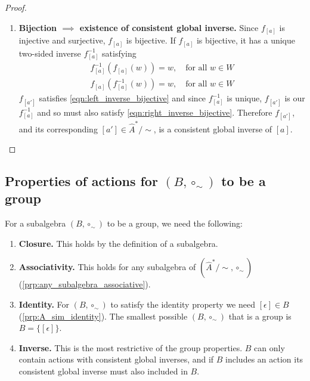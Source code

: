 \begin{proof}
\begin{enumerate}[(1)]
    \item \textbf{Bijection $\implies$ existence of consistent global inverse.}
    Since $f_{[a]}$ is injective and surjective, $f_{[a]}$ is bijective.
    If $f_{[a]}$ is bijective, it has a unique two-sided inverse $f_{[a]}^{-1}$ satisfying
    \begin{align}
        f_{[a]}^{-1}(f_{[a]}(w)) = w, \quad \text{for all $w \in W$} 
        \label{eqn:left_inverse_bijective}
        \\
        f_{[a]}(f_{[a]}^{-1}(w)) = w, \quad \text{for all $w \in W$}
        \label{eqn:right_inverse_bijective}
    \end{align}
    $f_{[a']}$ satisfies \cref{eqn:left_inverse_bijective} and since $f_{[a]}^{-1}$ is unique, $f_{[a']}$ is our $f_{[a]}^{-1}$ and so must also satisfy \cref{eqn:right_inverse_bijective}.
    Therefore $f_{[a']}$, and its corresponding $[a'] \in \hat{A}^{*}/\sim$, is a consistent global inverse of $[a]$.
    \end{enumerate}
\end{proof}

\subsection{Properties of actions for $(B, \circ_{\sim})$ to be a group}

For a subalgebra $(B, \circ_{\sim})$ to be a group, we need the following:
\begin{enumerate}[(1)]
    \item \textbf{Closure.}
    This holds by the definition of a subalgebra.
    
    \item \textbf{Associativity.}
    This holds for any subalgebra of $(\hat{A}^{*}/\sim, \circ_{\sim})$ (\cref{prp:any_subalgebra_associative}).

    \item \textbf{Identity.}
    For $(B, \circ_{\sim})$ to satisfy the identity property we need $[\epsilon] \in B$ (\cref{prp:A_sim_identity}).
    The smallest possible $(B, \circ_{\sim})$ that is a group is $B = \{ [\epsilon] \}$.

    \item \textbf{Inverse.}
    This is the most restrictive of the group properties.
    $B$ can only contain actions with consistent global inverses, and if $B$ includes an action its consistent global inverse must also included in $B$.
\end{enumerate}

